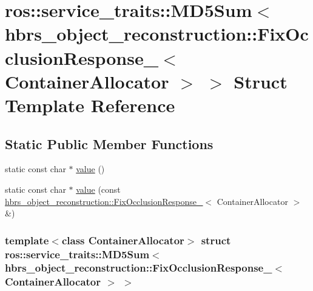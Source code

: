 \hypertarget{structros_1_1service__traits_1_1_m_d5_sum_3_01hbrs__object__reconstruction_1_1_fix_occlusion_rescad50a55fffa9d2254b798e29fe08d1f}{\section{ros\-:\-:service\-\_\-traits\-:\-:\-M\-D5\-Sum$<$ hbrs\-\_\-object\-\_\-reconstruction\-:\-:\-Fix\-Occlusion\-Response\-\_\-$<$ \-Container\-Allocator $>$ $>$ \-Struct \-Template \-Reference}
\label{structros_1_1service__traits_1_1_m_d5_sum_3_01hbrs__object__reconstruction_1_1_fix_occlusion_rescad50a55fffa9d2254b798e29fe08d1f}
}
\subsection*{\-Static \-Public \-Member \-Functions}
\begin{DoxyCompactItemize}
\item 
static const char $\ast$ \hyperlink{structros_1_1service__traits_1_1_m_d5_sum_3_01hbrs__object__reconstruction_1_1_fix_occlusion_rescad50a55fffa9d2254b798e29fe08d1f_a26a80307618c699807c5fcd45a365ec4}{value} ()
\item 
static const char $\ast$ \hyperlink{structros_1_1service__traits_1_1_m_d5_sum_3_01hbrs__object__reconstruction_1_1_fix_occlusion_rescad50a55fffa9d2254b798e29fe08d1f_a9f3d01b10360d144df885d0db4657843}{value} (const \hyperlink{structhbrs__object__reconstruction_1_1_fix_occlusion_response__}{hbrs\-\_\-object\-\_\-reconstruction\-::\-Fix\-Occlusion\-Response\-\_\-}$<$ \-Container\-Allocator $>$ \&)
\end{DoxyCompactItemize}
\subsubsection*{template$<$class Container\-Allocator$>$ struct ros\-::service\-\_\-traits\-::\-M\-D5\-Sum$<$ hbrs\-\_\-object\-\_\-reconstruction\-::\-Fix\-Occlusion\-Response\-\_\-$<$ Container\-Allocator $>$ $>$}



